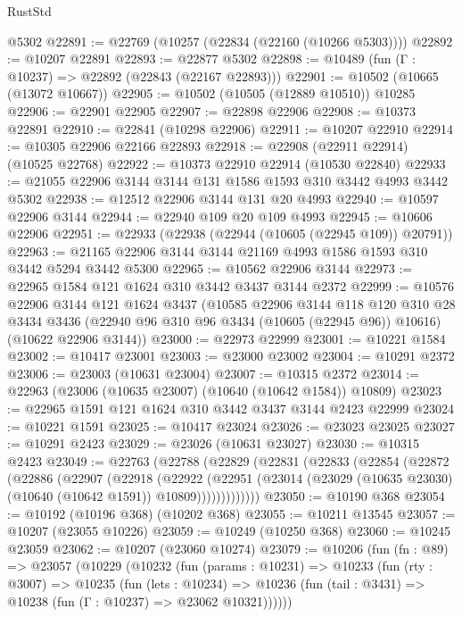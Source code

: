 \begin{lexlean}{RustStd}
\begin{coremodule}
    @5302
@22891 := @22769 (@10257 (@22834 (@22160 (@10266 @5303))))
@22892 := @10207 @22891
@22893 := @22877 @5302
@22898 := @10489 (fun (Γ : @10237) => @22892 (@22843 (@22167 @22893)))
@22901 := @10502 (@10665 (@13072 @10667))
@22905 := @10502 (@10505 (@12889 @10510)) @10285
@22906 := @22901 @22905
@22907 := @22898 @22906
@22908 := @10373 @22891
@22910 := @22841 (@10298 @22906)
@22911 := @10207 @22910
@22914 := @10305 @22906 @22166 @22893
@22918 := @22908 (@22911 @22914) (@10525 @22768)
@22922 := @10373 @22910 @22914 (@10530 @22840)
@22933 := @21055 @22906 @3144 @3144 @131 @1586 @1593 @310 @3442 @4993 @3442 @5302
@22938 := @12512 @22906 @3144 @131 @20 @4993
@22940 := @10597 @22906 @3144
@22944 := @22940 @109 @20 @109 @4993
@22945 := @10606 @22906
@22951 := @22933 (@22938 (@22944 (@10605 (@22945 @109)) @20791))
@22963 := @21165 @22906 @3144 @3144 @21169 @4993 @1586 @1593 @310 @3442 @5294 @3442 @5300
@22965 := @10562 @22906 @3144
@22973 := @22965 @1584 @121 @1624 @310 @3442 @3437 @3144 @2372
@22999 := @10576
    @22906
    @3144
    @121
    @1624
    @3437
    (@10585
      @22906
      @3144
      @118
      @120
      @310
      @28
      @3434
      @3436
      (@22940 @96 @310 @96 @3434 (@10605 (@22945 @96)) @10616)
      (@10622 @22906 @3144))
@23000 := @22973 @22999
@23001 := @10221 @1584
@23002 := @10417 @23001
@23003 := @23000 @23002
@23004 := @10291 @2372
@23006 := @23003 (@10631 @23004)
@23007 := @10315 @2372
@23014 := @22963 (@23006 (@10635 @23007) (@10640 (@10642 @1584)) @10809)
@23023 := @22965 @1591 @121 @1624 @310 @3442 @3437 @3144 @2423 @22999
@23024 := @10221 @1591
@23025 := @10417 @23024
@23026 := @23023 @23025
@23027 := @10291 @2423
@23029 := @23026 (@10631 @23027)
@23030 := @10315 @2423
@23049 := @22763
    (@22788
      (@22829
        (@22831
          (@22833
            (@22854
              (@22872
                (@22886
                  (@22907
                    (@22918
                      (@22922
                        (@22951
                          (@23014
                            (@23029 (@10635 @23030) (@10640 (@10642 @1591)) @10809)))))))))))))
@23050 := @10190 @368
@23054 := @10192 (@10196 @368) (@10202 @368)
@23055 := @10211 @13545
@23057 := @10207 (@23055 @10226)
@23059 := @10249 (@10250 @368)
@23060 := @10245 @23059
@23062 := @10207 (@23060 @10274)
@23079 := @10206
    (fun (fn : @89) =>
    @23057
      (@10229
        (@10232
          (fun (params : @10231) =>
          @10233
            (fun (rty : @3007) =>
            @10235
              (fun (lets : @10234) =>
              @10236 (fun (tail : @3431) => @10238 (fun (Γ : @10237) => @23062 @10321))))))

\end{coremodule}
\end{lexlean}
